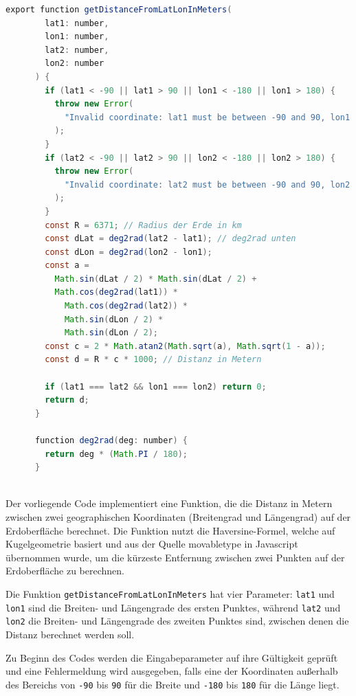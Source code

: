 \begin{lstlisting}[language=Java,caption=getDistanceFromLatLonInMeters Funktion]
    export function getDistanceFromLatLonInMeters(
        lat1: number,
        lon1: number,
        lat2: number,
        lon2: number
      ) {
        if (lat1 < -90 || lat1 > 90 || lon1 < -180 || lon1 > 180) {
          throw new Error(
            "Invalid coordinate: lat1 must be between -90 and 90, lon1 must be between -180 and 180"
          );
        }
        if (lat2 < -90 || lat2 > 90 || lon2 < -180 || lon2 > 180) {
          throw new Error(
            "Invalid coordinate: lat2 must be between -90 and 90, lon2 must be between -180 and 180"
          );
        }
        const R = 6371; // Radius der Erde in km
        const dLat = deg2rad(lat2 - lat1); // deg2rad unten
        const dLon = deg2rad(lon2 - lon1);
        const a =
          Math.sin(dLat / 2) * Math.sin(dLat / 2) +
          Math.cos(deg2rad(lat1)) *
            Math.cos(deg2rad(lat2)) *
            Math.sin(dLon / 2) *
            Math.sin(dLon / 2);
        const c = 2 * Math.atan2(Math.sqrt(a), Math.sqrt(1 - a));
        const d = R * c * 1000; // Distanz in Metern
      
        if (lat1 === lat2 && lon1 === lon2) return 0;
        return d;
      }
      
      function deg2rad(deg: number) {
        return deg * (Math.PI / 180);
      }
      
\end{lstlisting}
Der vorliegende Code implementiert eine Funktion, die die
Distanz in Metern zwischen zwei geographischen Koordinaten
(Breitengrad und Längengrad) auf der Erdoberfläche
berechnet. Die Funktion nutzt die Haversine-Formel, welche auf Kugelgeometrie basiert und aus der Quelle \cite{movabletype} movabletype in Javascript übernommen wurde, um die kürzeste Entfernung zwischen zwei Punkten auf der Erdoberfläche zu berechnen.

Die Funktion \texttt{getDistanceFromLatLonInMeters} hat vier Parameter: \texttt{lat1} und \texttt{lon1} sind die Breiten- und Längengrade des ersten Punktes, während \texttt{lat2} und \texttt{lon2} die Breiten- und Längengrade des zweiten Punktes sind, zwischen denen die Distanz berechnet werden soll.

Zu Beginn des Codes werden die Eingabeparameter auf ihre Gültigkeit geprüft und eine Fehlermeldung wird ausgegeben, falls eine der Koordinaten außerhalb des Bereichs von \texttt{-90} bis \texttt{90} für die Breite und \texttt{-180} bis \texttt{180} für die Länge liegt.

